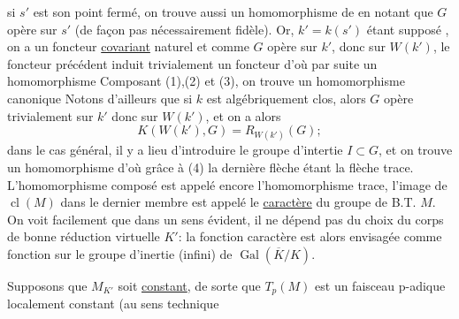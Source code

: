 si $s'$ est son point fermé, on trouve aussi un homomorphisme de 
en notant que $G$ opère sur $s'$ (de façon pas nécessairement fidèle). Or, $k'=k(s')$ étant supposé , on a un foncteur \uline{covariant} naturel
et comme $G$ opère sur $k'$, donc sur $W(k')$, le foncteur précédent induit trivialement un foncteur
d'où par suite un homomorphisme
Composant (1),(2) et (3), on trouve un homomorphisme canonique
Notons d'ailleurs que si $k$ est algébriquement clos, alors $G$ opère trivialement sur $k'$ donc sur $W(k')$, et on a alors
\[
K(W(k'),G)=R_{W(k')}(G);
\]
dans le cas général, il y a lieu d'introduire le groupe d'intertie $I\subset G$, et on trouve un homomorphisme
d'où grâce à (4)
la dernière flèche étant la flèche trace. L'homomorphisme composé est appelé encore l'homomorphisme trace, l'image de $\operatorname{cl}(M)$ dans le dernier membre est appelé le \uline{caractère} du groupe de B.T. $M$. On voit facilement que dans un sens évident, il ne dépend pas du choix du corps de bonne réduction virtuelle $K'$: la fonction caractère est alors envisagée comme fonction sur le groupe d'inertie (infini) de $\operatorname{Gal}(\overline K/K)$.

Supposons que $M_{K'}$ soit \uline{constant}, de sorte que  $T_p(M)$ est un faisceau p-adique localement constant (au sens technique

